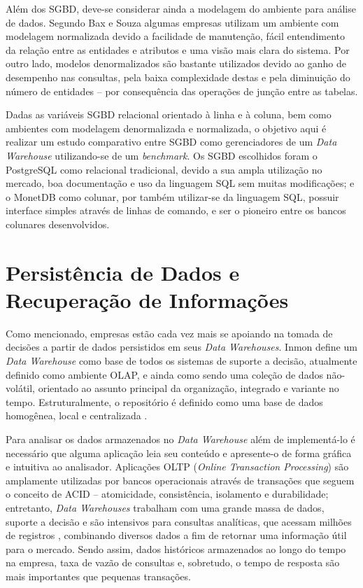 \documentclass[conference]{IEEEtran}
\begin{document}
Além dos SGBD, deve-se considerar ainda a modelagem do ambiente para análise de dados. Segundo Bax e Souza \cite{bax2003modelagem} algumas empresas utilizam um ambiente com modelagem normalizada devido a facilidade de manutenção, fácil entendimento da relação entre as entidades e atributos e uma visão mais clara do sistema. Por outro lado, modelos denormalizados são bastante utilizados devido ao ganho de desempenho nas consultas, pela baixa complexidade destas e pela diminuição do número de entidades -- por consequência das operações de junção entre as tabelas.

Dadas as variáveis SGBD relacional orientado à linha e à coluna, bem como ambientes com modelagem denormalizada e normalizada, o objetivo aqui é realizar um estudo comparativo entre SGBD como gerenciadores de um \textit{Data Warehouse} utilizando-se de um \textit{benchmark}. Os SGBD escolhidos foram o PostgreSQL como relacional tradicional, devido a sua ampla utilização no mercado, boa documentação e uso da linguagem SQL sem muitas modificações; e o MonetDB como colunar, por também utilizar-se da linguagem SQL, possuir interface simples através de linhas de comando, e ser o pioneiro entre os bancos colunares desenvolvidos.

\section{Persistência de Dados e Recuperação de Informações}

Como mencionado, empresas estão cada vez mais se apoiando na tomada de decisões a partir de dados persistidos em seus \textit{Data Warehouses}. Inmon \cite{inmon2005building} define um \textit{Data Warehouse} como base de todos os sistemas de suporte a decisão, atualmente definido como ambiente OLAP, e ainda como sendo uma coleção de dados não-volátil, orientado ao assunto principal da organização, integrado e variante no tempo. Estruturalmente, o repositório é definido como uma base de dados homogênea, local e centralizada \cite{wrembel2007data}.

Para analisar os dados armazenados no \textit{Data Warehouse} além de implementá-lo é necessário que alguma aplicação leia seu conteúdo e apresente-o de forma gráfica e intuitiva ao analisador. Aplicações OLTP (\textit{Online Transaction Processing}) são amplamente utilizadas por bancos operacionais através de transações que seguem o conceito de ACID -- atomicidade, consistência, isolamento e durabilidade; entretanto, \textit{Data Warehouses} trabalham com uma grande massa de dados, suporte a decisão e são intensivos para consultas analíticas, que acessam milhões de registros \cite{chaudhuri1997overview}, combinando diversos dados a fim de retornar uma informação útil para o mercado. Sendo assim, dados históricos armazenados ao longo do tempo na empresa, taxa de vazão de consultas e, sobretudo, o tempo de resposta são mais importantes que pequenas transações. 
\end{document}
